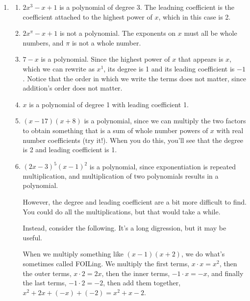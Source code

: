 \documentclass[noauthor]{ximera}
\begin{document}
\begin{problem}
\begin{explanation}
\begin{enumerate}
    Notice that we'll say 0 and 1 are whole numbers, so \(x^1\), which we usually write as \(x\) is a polynomial. Same with \(x^0\), which we usually write as 1.

    Notice that when you multiply polynomials, you get another polynomial, since you can always rewrite in the above form.

    \item 
    \begin{enumerate}
        \item \(2x^3 - x + 1\) is a polynomial of degree 3. The leadning coefficient is the coefficient attached to the highest power of \(x\), which in this case is 2.
        \item \(2x^\pi - x + 1\) is not a polynomial. The exponents on \(x\) must all be whole numbers, and \(\pi\) is not a whole number.
        \item \(7 - x\) is a polynomial. Since the highest power of \(x\) that appears is \(x\), which we can rewrite as \(x^1\), its degree is 1 and its leading coefficient is \(-1\). Notice that 
        the order in which we write the terms does not matter, since addition's order does not matter.
        \item \(x\) is a polynomial of degree 1 with leading coefficient 1.
        \item \((x - 17)(x + 8)\) is a polynomial, since we can multiply the two factors to obtain something that is a sum of whole number powers of \(x\) with real 
        number coefficients (try it!). When you do this, you'll see that the degree is 2 and leading coefficient is 1.
        \item \((2x - 3)^5(x - 1)^2\) is a polynomial, since exponentiation is repeated multiplication, and multiplication of two polynomials results in a polynomial.
        
        However, the degree and leading coefficient are a bit more difficult to find. You could do all the multiplications, but that would take a while.
        
        Instead, consider the following. It's a long digression, but it may be useful.
        
        When we multiply something like \((x - 1)(x + 2)\), we do what's sometimes called FOILing. We multiply the first terms, \(x \cdot x = x^2\),
        then the outer terms, \(x \cdot 2 = 2x\), then the inner terms, \(-1 \cdot x = -x\), and finally the last terms, \(-1 \cdot 2 = -2\), then add them together,
        \(x^2 + 2x + (-x) + (-2) = x^2 + x - 2\).


\end{enumerate}
\end{enumerate}
\end{explanation}
\end{problem}
\end{document}
